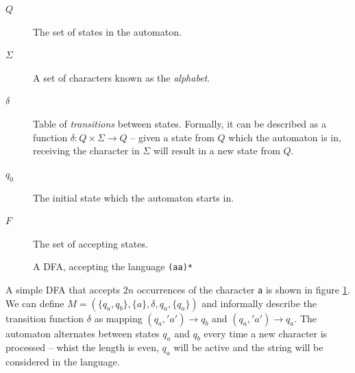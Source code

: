 \documentclass[a4paper,openany,12pt]{book}
\begin{document}
\begin{description}
    \item[$Q$] The set of states in the automaton.
    \item[$\Sigma$] A set of characters known as the \emph{alphabet}.
    \item[$\delta$] Table of \emph{transitions} between states.
                    Formally, it can be described as a function $\delta : Q \times \Sigma \rightarrow Q$ -- given a
                    state from $Q$ which the automaton is in, receiving the character in $\Sigma$ will result in a
                    new state from $Q$.
    \item[$q_0$] The initial state which the automaton starts in.
    \item[$F$] The set of accepting states.
\end{description}
    
\begin{figure}[H]
    \begin{MyMdframed}
        \vspace{0.5em}
        \caption{\label{figure:dfa:1} A DFA, accepting the language \texttt{(aa)*}}
        \vspace{0.5em}
        \captionsetup{style=default}


        \vspace{0.5em}
    \end{MyMdframed}
\end{figure}

A simple DFA that accepts $2n$ occurrences of the character \texttt{a} is shown in figure \ref{figure:dfa:1}.
We can define $M = (\{q_a,q_b\}, \{a\}, \delta, q_a, \{q_a\})$ and informally describe the transition function $\delta$
as mapping $(q_a, 'a') \rightarrow q_b$ and $(q_a, 'a') \rightarrow q_a$.
The automaton alternates between states $q_a$ and $q_b$ every time a new character is processed -- whist the length is
even, $q_a$ will be active and the string will be considered in the language.
\end{document}
